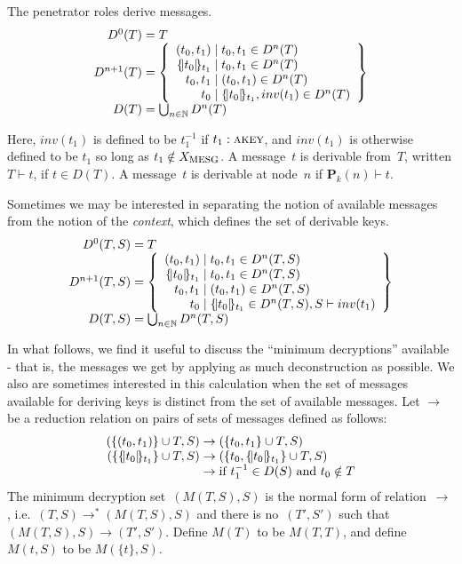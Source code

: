 \documentclass[12pt]{article}
\theoremstyle{definition}
\newcommand{\scap}[1]{\ensuremath{\mathop{\relax
                    \smash{\mbox{\sc#1}}}\!\mathop{\vphantom{#1}}\nolimits}}
\newcommand{\pubmsg}{\mathbf{P}}
\begin{document}
The penetrator roles derive messages.
$$\begin{array}{r@{{}={}}l}
D^0(T)&T\\
D^{n+1}(T)&\left\{\begin{array}{r@{{}\mid{}}l}
(t_0,t_1)&t_0,t_1\in D^n(T)\\
\enc{t_0}{t_1}&t_0,t_1\in D^n(T)\\
t_0,t_1 &(t_0,t_1) \in D^n(T)\\
t_0 & \enc{t_0}{t_1}, inv(t_1) \in D^n(T)
\end{array}\right\}\\
D(T)&\bigcup_{n\in\nat}D^n(T)
\end{array}$$

Here, $inv(t_1)$ is defined to be $t_1^{-1}$ if $t_1 : \scap{akey}$, and
$inv(t_1)$ is otherwise defined to be $t_1$ so long as $t_1 \notin X_{\scap{mesg}}$.
A message~$t$ is derivable from~$T$, written $T\vdash t$, if $t\in D(T)$.
A message~$t$ is derivable at node~$n$ if $\pubmsg_k(n)\vdash t$.

Sometimes we may be interested in separating the notion of available messages
from the notion of the \emph{context}, which defines the set of derivable keys.
$$\begin{array}{r@{{}={}}l}
D^0(T,S)&T\\
D^{n+1}(T,S)&\left\{\begin{array}{r@{{}\mid{}}l}
(t_0,t_1)&t_0,t_1\in D^n(T,S)\\
\enc{t_0}{t_1}&t_0,t_1\in D^n(T,S)\\
t_0,t_1 &(t_0,t_1) \in D^n(T,S)\\
t_0 & \enc{t_0}{t_1} \in D^n(T,S), S \vdash inv(t_1)
\end{array}\right\}\\
D(T,S)&\bigcup_{n\in\nat}D^n(T,S)
\end{array}$$

In what follows, we find it useful to discuss the ``minimum decryptions''
available - that is, the messages we get by applying as much deconstruction as
possible.  We also are sometimes interested in this calculation when the set
of messages available for deriving keys is distinct from the set of available
messages.  Let $\to$ be a reduction relation on pairs of sets of messages defined
as follows:
$$\begin{array}{r@{{}\to{}}ll}
(\{(t_0,t_1)\}\cup T, S)&(\{t_0,t_1\}\cup T, S)\\
(\{\enc{t_0}{t_1}\}\cup T, S)&(\{t_0,\enc{t_0}{t_1}\}\cup T, S)\\
&\mbox{if $t_1^{-1}\in D(S)$ and $t_0\notin T$}
\end{array}$$
The minimum decryption set~$(M(T,S),S)$ is the normal form of relation~$\to$,
i.e.\ $(T,S)\to^\ast (M(T,S),S)$ and there is no~$(T',S')$ such that $(M(T,S),S)\to(T',S')$.
Define $M(T)$ to be $M(T,T)$, and define $M(t,S)$ to be $M(\{t\},S)$.
\end{document}
